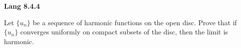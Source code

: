 \textbf{Lang 8.4.4}

Let $\{u_n\}$ be a sequence of harmonic functions on the open disc. Prove that if $\{u_n\}$ converges uniformly on 
compact subsets of the disc, then the limit is harmonic.

\begin{solution}
  \ \\
\end{solution}
